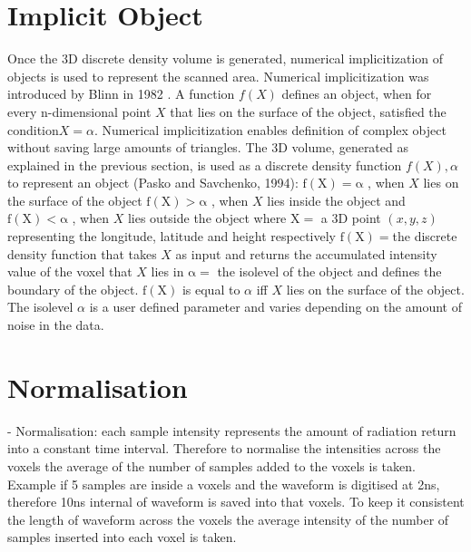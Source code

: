 \documentclass{subfiles}
\begin{document}
\section{Implicit Object}
Once the 3D discrete density volume is generated, numerical implicitization of objects is used to represent the scanned area. Numerical implicitization was introduced by Blinn in 1982 \cite{Blinn1982}. A function $ \mathit{f(X)} $ defines an object, when for every n-dimensional point $ \mathit{X} $  that lies on the surface of the object, satisfied the condition$ \mathit{X=\alpha }  $. Numerical implicitization enables definition of complex object without saving large amounts of triangles. \newline
The 3D volume, generated as explained in the previous section, is used as a discrete density function $\mathit{f(X), \alpha }$ to represent an object (Pasko and Savchenko, 1994): \newline
$	\mathrm{f(X) = \alpha }$ , when $X$ lies on the surface of the object\newline
$	\mathrm{f(X) > \alpha }$ , when $X$ lies inside the object and\newline
$	\mathrm{f(X) < \alpha }$ , when $X$ lies outside the object	 \newline
where	\newline 
$	\mathrm{X 	=}$  a 3D point $\mathit{(x, y, z) }$ representing the longitude, latitude and height respectively  \newline
$	\mathrm{f(X) 	= }$the discrete density function that takes  $\mathit{X}$ as input and returns the accumulated intensity value of the voxel that  $\mathit{X}$ lies in \newline
$	\mathrm{	\alpha 	= }$ the isolevel of the object and defines the boundary of the object. \newline
$	\mathrm{	f(X)}$ is equal to $\mathit{\alpha }$ iff  $\mathit{X}$ lies on the surface of the object. The isolevel $\mathit{\alpha }$ is a user defined parameter and varies depending on the amount of noise in the data.  \newline



\section{Normalisation}
- Normalisation: each sample intensity represents the amount of radiation return into a constant time interval. Therefore to normalise the intensities across the voxels the average of the number of samples added to the voxels is taken. Example if 5 samples are inside a voxels and the waveform is digitised at 2ns, therefore 10ns internal of waveform is saved into that voxels. To keep it consistent the length of waveform across the voxels the average intensity of the number of samples inserted into each voxel is taken. 
\end{document}
